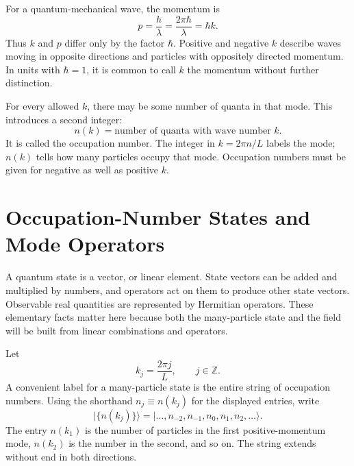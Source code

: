 For a quantum-mechanical wave, the momentum is
\begin{equation}
p=\frac{h}{\lambda}
=\frac{2\pi\hbar}{\lambda}
=\hbar k.
\end{equation}
Thus \(k\) and \(p\) differ only by the factor \(\hbar\). Positive and negative \(k\) describe waves moving in opposite directions and particles with oppositely directed momentum. In units with \(\hbar=1\), it is common to call \(k\) the momentum without further distinction.

For every allowed \(k\), there may be some number of quanta in that mode. This introduces a second integer:
\begin{equation}
n(k)=\text{number of quanta with wave number }k.
\end{equation}
It is called the occupation number. The integer in \(k=2\pi n/L\) labels the mode; \(n(k)\) tells how many particles occupy that mode. Occupation numbers must be given for negative as well as positive \(k\).

\begin{classroomqa}
\end{classroomqa}

\section{Occupation-Number States and Mode Operators}

A quantum state is a vector, or linear element. State vectors can be added and multiplied by numbers, and operators act on them to produce other state vectors. Observable real quantities are represented by Hermitian operators. These elementary facts matter here because both the many-particle state and the field will be built from linear combinations and operators.

Let
\begin{equation}
k_j=\frac{2\pi j}{L},
\qquad j\in\mathbb Z.
\end{equation}
A convenient label for a many-particle state is the entire string of occupation numbers. Using the shorthand \(n_j\equiv n(k_j)\) for the displayed entries, write
\begin{equation}
\big|\{n(k_j)\}\big\rangle
=
\big|\ldots,n_{-2},n_{-1},n_0,n_1,n_2,\ldots\big\rangle.
\end{equation}
The entry \(n(k_1)\) is the number of particles in the first positive-momentum mode, \(n(k_2)\) is the number in the second, and so on. The string extends without end in both directions.

